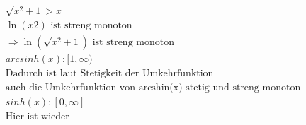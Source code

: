 \documentclass{HM}
\begin{document}
\begin{enumerate}
\begin{enumerate}
	\begin{align*}
		\sqrt{x^2+1} > x\\
		\ln(x2) \text{ ist streng monoton}\\
		\Rightarrow \ln(\sqrt{x^2+1})\text{ ist streng monoton}\\
		arcsinh(x):[1,\infty)\\
		\text{Dadurch ist laut Stetigkeit der Umkehrfunktion}\\\text{auch die Umkehrfunktion von arcshin(x) stetig und streng monoton}\\
		sinh(x): [0,\infty]\\
		\text{Hier ist wieder }
	\end{align*}
	
\end{enumerate}


\end{enumerate}
\end{document}
